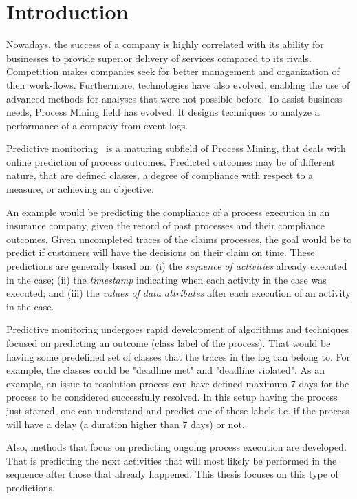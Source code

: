 

\section{Introduction} %
\label{sec:introduction}


Nowadays, the success of a company is highly correlated with its ability for businesses to provide superior delivery of services compared to its rivals. Competition makes companies seek for better management and organization of their work-flows. Furthermore, technologies have also evolved, enabling the use of advanced methods for analyses that were not possible before. To assist business needs, Process Mining field has evolved. It designs techniques to analyze a performance of a company from event logs.  

Predictive monitoring~\cite{Maggi:CAiSE2014} is a maturing subfield of Process Mining, that deals with online prediction of process outcomes. Predicted outcomes may be of different nature, that are defined classes, a degree of compliance with respect to a measure, or achieving an objective.

An example would be predicting the compliance of a process execution in an insurance company, given the record of past processes and their compliance outcomes. Given uncompleted traces of the claims processes, the goal would be to predict if customers will have the decisions on their claim on time. These predictions are generally based on: (i) the \emph{sequence of activities} already executed in the case; (ii) the \emph{timestamp} indicating when each activity in the case was executed; and (iii) the \emph{values of data attributes} after each execution of an activity in the case.



Predictive monitoring undergoes rapid development of algorithms and techniques focused on predicting an outcome (class label of the process). That would be having some predefined set of classes that the traces in the log can belong to. For example, the classes could be "deadline met" and "deadline violated". As an example, an issue to resolution process can have defined maximum 7 days for the process to be considered successfully resolved. In this setup having the process just started, one can understand and predict one of these labels i.e. if the process will have a delay (a duration higher than 7 days) or not.

Also, methods that focus on predicting ongoing process execution are developed. That is predicting the next activities that will most likely be performed in the sequence after those that already happened. This thesis focuses on this type of predictions.

